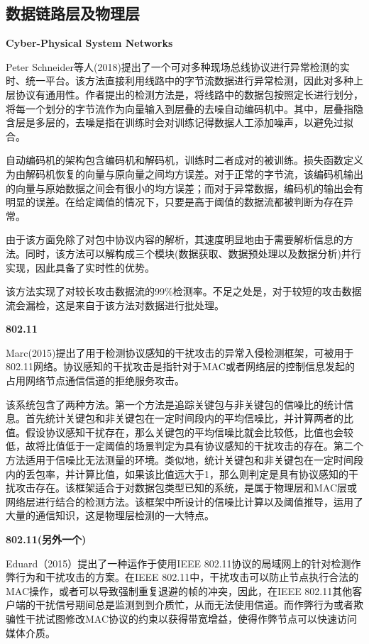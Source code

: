 \documentclass[12pt]{article} %
\begin{document}
\subsection{数据链路层及物理层}
\label{phy}

\textbf{Cyber-Physical System Networks}

Peter Schneider等人(2018)提出了一个可对多种现场总线协议进行异常检测的实时、统一平台。该方法直接利用线路中的字节流数据进行异常检测，因此对多种上层协议有通用性。作者提出的检测方法是，将线路中的数据包按照定长进行划分，将每一个划分的字节流作为向量输入到层叠的去噪自动编码机中。其中，层叠指隐含层是多层的，去噪是指在训练时会对训练记得数据人工添加噪声，以避免过拟合。

自动编码机的架构包含编码机和解码机，训练时二者成对的被训练。损失函数定义为由解码机恢复的向量与原向量之间均方误差。对于正常的字节流，该编码机输出的向量与原始数据之间会有很小的均方误差；而对于异常数据，编码机的输出会有明显的误差。在给定阈值的情况下，只要是高于阈值的数据流都被判断为存在异常。

由于该方面免除了对包中协议内容的解析，其速度明显地由于需要解析信息的方法。同时，该方法可以解构成三个模块(数据获取、数据预处理以及数据分析)并行实现，因此具备了实时性的优势。

该方法实现了对较长攻击数据流的99\%检测率。不足之处是，对于较短的攻击数据流会漏检，这是来自于该方法对数据进行批处理。

\textbf{802.11}

Marc(2015)提出了用于检测协议感知的干扰攻击的异常入侵检测框架，可被用于802.11网络。协议感知的干扰攻击是指针对于MAC或者网络层的控制信息发起的占用网络节点通信信道的拒绝服务攻击。

该系统包含了两种方法。第一个方法是追踪关键包与非关键包的信噪比的统计信息。首先统计关键包和非关键包在一定时间段内的平均信噪比，并计算两者的比值。假设协议感知干扰存在，那么关键包的平均信噪比就会比较低，比值也会较低，故将比值低于一定阈值的场景判定为具有协议感知的干扰攻击的存在。第二个方法适用于信噪比无法测量的环境。类似地，统计关键包和非关键包在一定时间段内的丢包率，并计算比值，如果该比值远大于1，那么则判定是具有协议感知的干扰攻击存在。该框架适合于对数据包类型已知的系统，是属于物理层和MAC层或网络层进行结合的检测方法。该框架中所设计的信噪比计算以及阈值推导，运用了大量的通信知识，这是物理层检测的一大特点。

\textbf{802.11(另外一个)}

Eduard（2015）提出了一种运作于使用IEEE 802.11协议的局域网上的针对检测作弊行为和干扰攻击的方案。在IEEE 802.11中，干扰攻击可以防止节点执行合法的MAC操作，或者可以导致强制重复退避的帧的冲突，因此，在IEEE 802.11其他客户端的干扰信号期间总是监测到到介质忙，从而无法使用信道。而作弊行为或者欺骗性干扰试图修改MAC协议的约束以获得带宽增益，使得作弊节点可以快速访问媒体介质。
\end{document}
